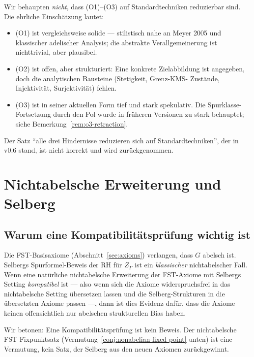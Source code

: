 \documentclass[11pt,a4paper]{article}
\theoremstyle{plain}
\theoremstyle{definition}
\begin{document}
Wir behaupten \emph{nicht}, dass (O1)--(O3) auf Standardtechniken
reduzierbar sind. Die ehrliche Einschätzung lautet:
\begin{itemize}[leftmargin=*]
\item (O1) ist vergleichsweise solide --- stilistisch nahe an Meyer 2005
  und klassischer adelischer Analysis; die abstrakte Verallgemeinerung ist
  nichttrivial, aber plausibel.
\item (O2) ist offen, aber strukturiert: Eine konkrete Zielabbildung ist
  angegeben, doch die analytischen Bausteine (Stetigkeit, Grenz-KMS-
  Zustände, Injektivität, Surjektivität) fehlen.
\item (O3) ist in seiner aktuellen Form tief und stark spekulativ. Die
  Spurklasse-Fortsetzung durch den Pol wurde in früheren Versionen zu
  stark behauptet; siehe Bemerkung~\ref{rem:o3-retraction}.
\end{itemize}
Der Satz ``alle drei Hindernisse reduzieren sich auf Standardtechniken'',
der in v0.6 stand, ist nicht korrekt und wird zurückgenommen.

\section{Nichtabelsche Erweiterung und Selberg}
\label{sec:selberg}

\subsection{Warum eine Kompatibilitätsprüfung wichtig ist}

Die FST-Basisaxiome (Abschnitt~\ref{sec:axioms}) verlangen, dass $G$
abelsch ist. Selbergs Spurformel-Beweis der RH für $Z_\Gamma$
\cite{Selberg1956} ist ein
\emph{klassischer} nichtabelscher Fall. Wenn eine natürliche nichtabelsche
Erweiterung der FST-Axiome mit Selbergs Setting \emph{kompatibel} ist ---
also wenn sich die Axiome widerspruchsfrei in das nichtabelsche Setting
übersetzen lassen und die Selberg-Strukturen in die übersetzten Axiome
passen ---, dann ist dies Evidenz dafür, dass die Axiome keinen offensichtlich
nur abelschen strukturellen Bias haben.

Wir betonen: Eine Kompatibilitätsprüfung ist kein Beweis. Der nichtabelsche
FST-Fixpunktsatz (Vermutung~\ref{conj:nonabelian-fixed-point} unten) ist
eine Vermutung, kein Satz, der Selberg aus den neuen Axiomen zurückgewinnt.
\end{document}
